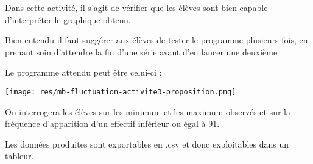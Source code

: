 %
%
\begin{methode}
Dans cette activité, il s'agit de vérifier que les élèves sont bien capable d'interpréter le graphique obtenu.

Bien entendu il faut suggérer aux élèves de tester le programme plusieurs fois, en prenant soin d'attendre la fin d'une série avant d'en lancer une deuxième

Le programme attendu peut être celui-ci  :

    \texttt{[image: res/mb-fluctuation-activite3-proposition.png]}

\end{methode}


\begin{remarque}
   On interrogera les élèves sur les minimum et les maximum observés et sur la fréquence d'apparition d'un effectif inférieur ou égal à 91.

   Les données produites sont exportables en .csv et donc exploitables dans un tableur.
\end{remarque}
